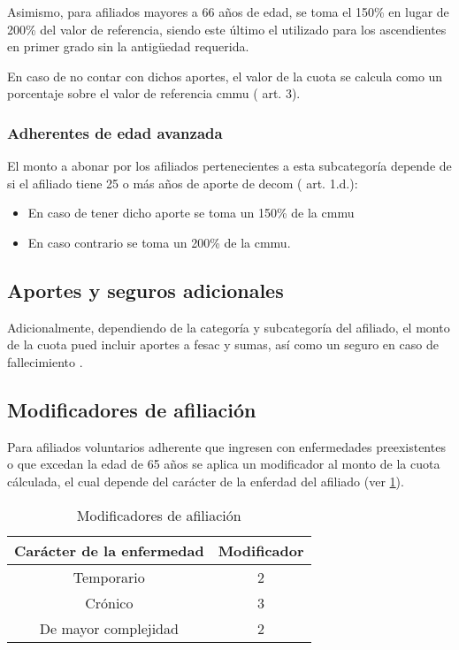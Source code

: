 Asimismo, para afiliados mayores a 66 años de edad, se toma el 150\% en lugar de 200\% del valor de referencia, siendo este último el utilizado para los ascendientes en primer grado sin la antigüedad requerida.

En caso de no contar con dichos aportes, el valor de la cuota se calcula como un porcentaje sobre el valor de referencia \acrshort{cmmu} (\cite{dospuRes21} art. 3).

\subsubsection{Adherentes de edad avanzada}\label{sssec:edad_avanzada}
El monto a abonar por los afiliados pertenecientes a esta subcategoría depende de si el afiliado tiene 25 o más años de aporte de \acrfull{decom} (\cite{dospuRes7} art. 1.d.):
\begin{itemize}
    \item En caso de tener dicho aporte se toma un 150\% de la \acrshort{cmmu}
    \item En caso contrario se toma un 200\% de la \acrshort{cmmu}.
\end{itemize}

\subsection{Aportes y seguros adicionales}
Adicionalmente, dependiendo de la categoría y subcategoría del afiliado, el monto de la cuota pued incluir aportes a \acrfull{fesac} y \acrfull{sumas}, así como un seguro en caso de fallecimiento \cite{dospuRes31, dospuRes43, dospuRes71}.

\subsection{Modificadores de afiliación}
Para afiliados voluntarios adherente que ingresen con enfermedades preexistentes o que excedan la edad de 65 años se aplica un modificador al monto de la cuota cálculada, el cual depende del carácter de la enferdad del afiliado (ver \cref{tbl:modificadores}).

\begin{table}
\begin{tabular}{|c|c|}
    \hline
    Carácter de la enfermedad & Modificador \\ \hline
    Temporario & 2 \\ \hline
    Crónico & 3 \\ \hline
    De mayor complejidad & 2 \\ \hline
\end{tabular}
\caption{Modificadores de afiliación}
\label{tbl:modificadores}
\end{table}

